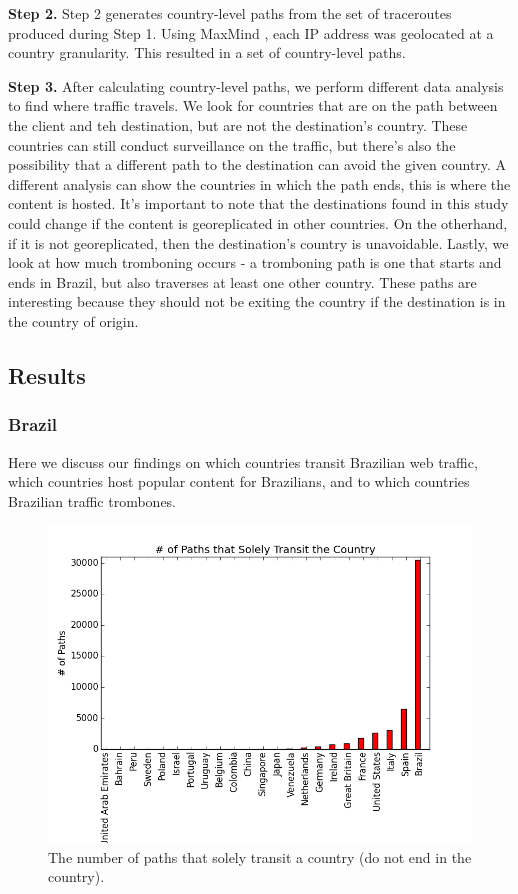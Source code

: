 {\bf Step 2.}  Step 2 generates country-level paths from the set of traceroutes produced during Step 1.  Using MaxMind , each IP address was geolocated at a country granularity.  This resulted in a set of country-level paths.  

{\bf Step 3.}  After calculating country-level paths, we perform different data analysis to find where traffic travels.  We look for countries that are on the path between the client and teh destination, but are not the destination's country.  These countries can still conduct surveillance on the traffic, but there's also the possibility that a different path to the destination can avoid the given country.  A different analysis can show the countries in which the path ends, this is where the content is hosted.  It's important to note that the destinations found in this study could change if the content is georeplicated in other countries.  On the otherhand, if it is not georeplicated, then the destination's country is unavoidable.  Lastly, we look at how much tromboning occurs - a tromboning path is one that starts and ends in Brazil, but also traverses at least one other country.  These paths are interesting because they should not be exiting the country if the destination is in the country of origin.  

\subsection{Results}

\subsubsection{Brazil}
Here we discuss our findings on which countries transit Brazilian web traffic, which countries host popular content for Brazilians, and to which countries Brazilian traffic trombones.  

\begin{figure}
\centering
\includegraphics[width=.8\textwidth]{transit_graph_no_zero}
\caption{The number of paths that solely transit a country (do not end in the country).}
\label{fig:transit}
\end{figure}

